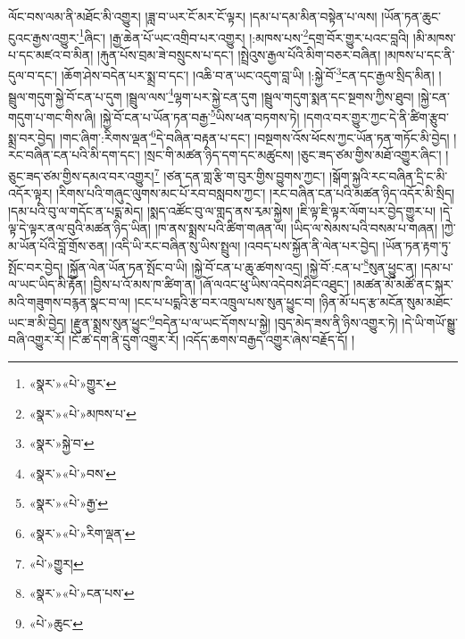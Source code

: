 ལོང་བས་ལམ་ནི་མཐོང་མི་འགྱུར། །ཟླ་བ་ཡར་ངོ་མར་ངོ་ལྟར། །དམ་པ་དམ་མིན་བསྟེན་པ་ལས། །ཡོན་ཏན་ཆུང་ངུའང་རྒྱས་འགྱུར་\footnote{«སྣར་»«པེ་»གྱུར་}ཞིང་། །རྒྱ་ཆེན་པོ་ཡང་འགྲིབ་པར་འགྱུར། །:མཁས་པས་\footnote{«སྣར་»«པེ་»མཁས་པ་}དགྲ་བོར་གྱུར་པའང་བླའི། །མི་མཁས་པ་དང་མཛའ་བ་མིན། །རྐུན་པོས་བྲམ་ཟེ་བསྲུངས་པ་དང་། །སྤྲེའུས་རྒྱལ་པོའི་མིག་བཅར་བཞིན། །མཁས་པ་དང་ནི་དུལ་བ་དང་། །ཆོག་ཤེས་བདེན་པར་སྨྲ་བ་དང་། །འཆི་བ་ན་ཡང་འདུག་བླ་ཡི། །:སྐྱེ་བོ་\footnote{«སྣར་»སྐྱེ་བ་}ངན་དང་རྒྱལ་སྲིད་མིན། །སྦྲུལ་གདུག་སྐྱེ་བོ་ངན་པ་དུག །སྦྲུལ་ལས་\footnote{«སྣར་»«པེ་»བས་}ལྷག་པར་སྐྱེ་ངན་དུག །སྦྲུལ་གདུག་སྨན་དང་སྔགས་ཀྱིས་ཐུབ། །སྐྱེ་ངན་གདུག་པ་གང་གིས་ཞི། །སྐྱེ་བོ་ངན་པ་ཡོན་ཏན་བརྒྱ་\footnote{«སྣར་»«པེ་»རྒྱ་}ཡིས་ཕན་བཏགས་ཏེ། །དགའ་བར་གྱུར་ཀྱང་དེ་ནི་ཚིག་རྩུབ་སྨྲ་བར་བྱེད། །གང་ཞིག་:རིགས་ལྡན་\footnote{«སྣར་»«པེ་»རིག་ལྡན་}དེ་བཞིན་བརྟན་པ་དང་། །བསྔགས་འོས་ཕོངས་ཀྱང་ཡོན་ཏན་གཏོང་མི་བྱེད། །རང་བཞིན་ངན་པའི་མི་དག་དང་། །སྲང་གི་མཚན་ཉིད་དག་དང་མཚུངས། །ཅུང་ཟད་ཙམ་གྱིས་མཐོ་འགྱུར་ཞིང་། །ཅུང་ཟད་ཙམ་གྱིས་དམའ་བར་འགྱུར།\footnote{«པེ་»གྱུར།} །ཙན་དན་གླ་རྩི་ག་བུར་གྱིས་བྱུགས་ཀྱང་། །སྒོག་སྐྱའི་རང་བཞིན་དྲི་ང་མི་འདོར་ལྟར། །རིགས་པའི་གཞུང་ལུགས་མང་པོ་རབ་བསླབས་ཀྱང་། །རང་བཞིན་ངན་པའི་མཚན་ཉིད་འདོར་མི་སྲིད། །དམ་པའི་བུ་ལ་གདོང་ན་པདྨ་མེད། །སྨད་འཚོང་བུ་ལ་གླད་ནས་རྭམ་སྐྱེས། །ཇི་ལྟ་ཇི་ལྟར་ལོག་པར་བྱེད་གྱུར་པ། །དེ་ལྟ་དེ་ལྟར་ནལ་བུའི་མཚན་ཉིད་ཡིན། །ཁ་ནས་སྨྲས་པའི་ཚིག་གཞན་ལ། །ཡིད་ལ་སེམས་པའི་བསམ་པ་གཞན། །ཀྱེ་མ་ཡོན་པོའི་བློ་གྲོས་ཅན། །འདི་ཡི་རང་བཞིན་སུ་ཡིས་སྤྲུལ། །འབད་པས་སྐྱོན་ནི་ལེན་པར་བྱེད། །ཡོན་ཏན་རྟག་ཏུ་སྤོང་བར་བྱེད། །སྐྱོན་ལེན་ཡོན་ཏན་སྤོང་བ་ཡི། །སྐྱེ་བོ་ངན་པ་ཆུ་ཚགས་འདྲ། །སྐྱེ་བོ་:ངན་པ་\footnote{«སྣར་»«པེ་»ངན་པས་}སུན་ཕྱུང་ན། །དམ་པ་ལ་ཡང་ཡིད་མི་རྟོན། །བྱིས་པ་འོ་མས་ཁ་ཚིག་ན། །ཞོ་ལའང་ཕུ་ཡིས་འདེབས་ཤིང་འཐུང་། །མཚན་མོ་མཚོ་ནང་སྐར་མའི་གཟུགས་བརྙན་སྣང་བ་ལ། །ངང་པ་པདྨའི་རྩ་བར་འཁྲུལ་པས་སུན་ཕྱུང་བ། །ཉིན་མོ་པད་རྩ་མངོན་སུམ་མཐོང་ཡང་ཟ་མི་བྱེད། །རྫུན་སྨྲས་སུན་ཕྱུང་\footnote{«པེ་»ཆུང་}བདེན་པ་ལ་ཡང་དོགས་པ་སྐྱེ། །བུད་མེད་ཟས་ནི་ཉིས་འགྱུར་ཏེ། །དེ་ཡི་གཡོ་སྒྱུ་བཞི་འགྱུར་རོ། །ངོ་ཚ་དག་ནི་དྲུག་འགྱུར་རོ། །འདོད་ཆགས་བརྒྱད་འགྱུར་ཞེས་བརྗོད་དོ། །
